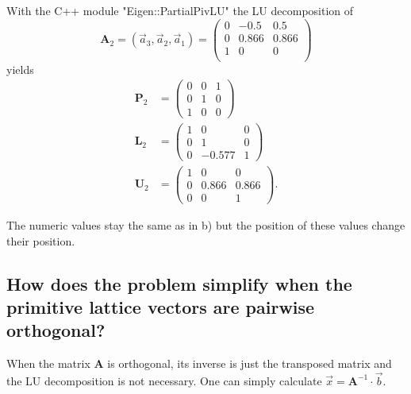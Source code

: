 With the C++ module "Eigen::PartialPivLU" the LU decomposition of
\begin{equation}
    \symbf{A}_2 = (\vec{a}_3,\vec{a}_2,\vec{a}_1) =
    \begin{pmatrix}
        0 & -0.5 & 0.5 \\
        0 & 0.866 & 0.866 \\
        1 & 0 & 0 \\
    \end{pmatrix}
\end{equation}
yields
\begin{align}
    \symbf{P}_2 &= 
    \begin{pmatrix}
        0 & 0 & 1 \\
        0 & 1 & 0 \\
        1 & 0 & 0 
    \end{pmatrix} \\
    \symbf{L}_2 &=
    \begin{pmatrix}
        1 & 0 & 0 \\
        0 & 1 & 0 \\
        0 & -0.577 & 1
    \end{pmatrix} \\
    \symbf{U}_2 &=
    \begin{pmatrix}
        1 & 0 & 0 \\
        0 & 0.866 & 0.866 \\
        0 & 0 & 1
    \end{pmatrix} .
\end{align}

The numeric values stay the same as in b) but the position of these values change their position.

\subsection{How does the problem simplify when the primitive lattice vectors are pairwise orthogonal?}

When the matrix $\symbf{A}$ is orthogonal, its inverse is just the transposed matrix
and the LU decomposition is not necessary.
One can simply calculate $\vec{x} = \symbf{A}^{-1} \cdot \vec{b}$.